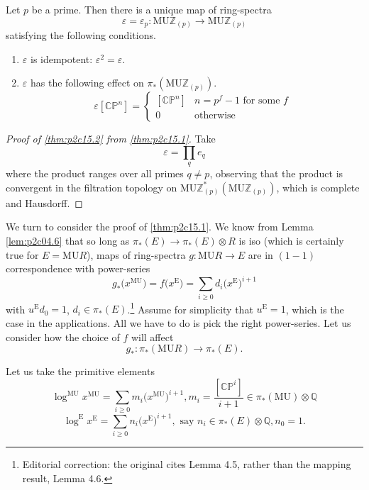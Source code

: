 \documentclass[../main]{subfiles}
\begin{document}
\begin{theorem}
\label{thm:p2c15.2}
Let $p$ be a prime. Then there is a unique map of ring-spectra \[\varepsilon=\varepsilon_p:\mathrm{MU}\mathbb{Z}_{(p)}\to\mathrm{MU}\mathbb{Z}_{(p)}\] satisfying the following conditions.
\begin{enumerate}
    \item $\varepsilon$ is idempotent: $\varepsilon^2=\varepsilon$.
    \item $\varepsilon$ has the following effect on $\pi_\ast(\mathrm{MU}\mathbb{Z}_{(p)})$. 
    \[\varepsilon[\mathbb{CP}^n]=
        \begin{cases}
            [\mathbb{CP}^n] & n=p^f-1\text{ for some }f\\
            0 & \mathrm{otherwise}
        \end{cases}\]
\end{enumerate}
\end{theorem}  

\begin{proof}[Proof of \eqref{thm:p2c15.2} from \eqref{thm:p2c15.1}]
Take \[\varepsilon=\prod_qe_q\] where the product ranges over all primes $q\neq p$, observing that the product is convergent in the filtration topology on $\mathrm{MU}\mathbb{Z}_{(p)}^\ast(\mathrm{MU}\mathbb{Z}_{(p)})$, which is complete and Hausdorff.
\end{proof}

We turn to consider the proof of \eqref{thm:p2c15.1}. We know from Lemma \ref{lem:p2c04.6} that so long as $\pi_\ast(E)\longrightarrow\pi_\ast(E)\otimes R$ is iso (which is certainly true
for $E = \mathrm{MU}R$), maps of ring-spectra $g:\mathrm{MU}R\longrightarrow E$ are in $(1-1)$ correspondence with power-series \[g_\ast\big(x^{\mathrm{MU}}\big)=f\big(x^\mathrm{E}\big)=\sum_{i\geq 0}d_i\big(x^{\mathrm{E}}\big)^{i+1}\] with $u^{\mathrm{E}}d_0=1$, $d_i\in\pi_\ast(E)$.\footnote{Editorial correction: the original cites Lemma 4.5, rather than the mapping result, Lemma 4.6.} Assume for simplicity that $u^{\mathrm{E}} = 1$, which is the case in the applications. All we have to do is pick the right power-series. Let us consider how the choice of $f$ will affect \[g_\ast:\pi_\ast(\mathrm{MU}R)\longrightarrow\pi_\ast(E).\]

Let us take the primitive elements
\[\log^{\mathrm{MU}}x^{\mathrm{MU}}=\sum_{i\geq0}m_i\big(x^{\mathrm{MU}}\big)^{i+1}, m_i=\dfrac{[\mathbb{CP}^i]}{i+1}\in\pi_\ast(\mathrm{MU})\otimes\mathbb{Q}\]
\[\log^{\mathrm{E}}x^{\mathrm{E}}=\sum_{i\geq0}n_i\big(x^{\mathrm{E}}\big)^{i+1},\text{ say }n_i\in\pi_\ast(E)\otimes\mathbb{Q},n_0=1.\]
\end{document}

